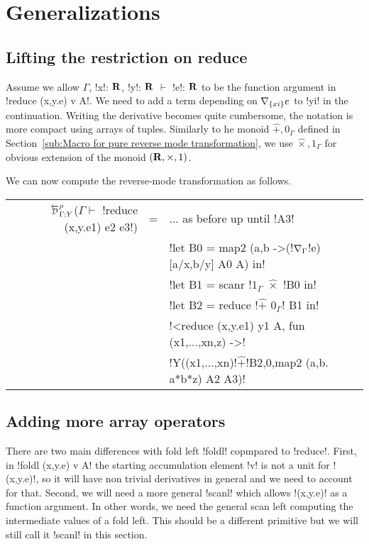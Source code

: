 \section{Generalizations}
\label{sec:generalization}


\subsection{Lifting the restriction on reduce}
\label{sub:Lifting the restriction on reduce}

Assume we allow $\Gamma$, !x!: $\mathbf{R}$, !y!: $\mathbf{R}$ $\vdash$ !e!: $\mathbf{R}$ to be the function argument in
!reduce (x,y.e) v A!. We need to add a term depending on $\nabla_{\{xi\}}e$ to !yi! in the continuation.
Writing the derivative becomes quite cumbersome, the notation is more compact using arrays of tuples. 
Similarly to he monoid $\widehat{+},0_\Gamma$ defined in Section~\ref{sub:Macro for pure reverse mode transformation},
we use $\widehat{\times},1_\Gamma$ for obvious extension of the monoid $(\mathbf{R},\times,1)$.

We can now compute the reverse-mode transformation as follows.
\begin{center}
\begin{tabular}{r c l}
$\directD{\rho}{\Gamma}{Y}$($\Gamma\vdash $ !reduce (x,y.e1) e2 e3!) 
&=& ... as before up until !A3! \\
&& !let B0 = map2 (a,b ->(!$\nabla_\Gamma$!e)[a/x,b/y] A0 A) in!\\
&& !let B1 = scanr !$1_\Gamma$ $\widehat{\times}$ !B0 in! \\
&& !let B2 = reduce !$\widehat{+}$ $0_\Gamma$! B1 in! \\
&& !<reduce (x,y.e1) y1 A, fun (x1,...,xn,z) ->! \\
&& !Y((x1,...,xn)!$\widehat{+}$!B2,0,map2 (a,b. a*b*z) A2 A3)!
\end{tabular}
\end{center}

\subsection{Adding more array operators}
\label{sub:Adding more array operators}

There are two main differences with fold left !foldl! copmpared to !reduce!. 
First, in !foldl (x,y.e) v A! the starting accumulation element !v! is not a unit for !(x,y.e)!,
so it will have non trivial derivatives in general and we need to account for that.
Second, we will need a more general !scanl! which allows !(x,y.e)! as a function argument. 
In other words, we need the general scan left computing the intermediate values of a fold left.
This should be a different primitive but we will still call it !scanl! in this section.

